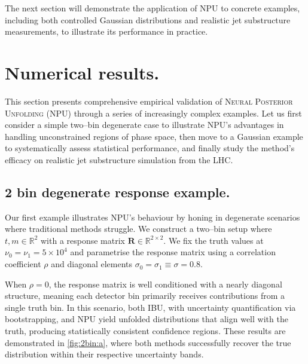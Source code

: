     The next section will demonstrate the application of NPU to concrete examples, including both controlled Gaussian distributions and realistic jet substructure measurements, to illustrate its performance in practice.
\section{Numerical results.}
    This section presents comprehensive empirical validation of \textsc{Neural Posterior Unfolding} (NPU) through a series of increasingly complex examples.
    Let us first consider a simple two--bin degenerate case to illustrate NPU's advantages in handling unconstrained regions of phase space, then move to a Gaussian example to systematically assess statistical performance, and finally study the method's efficacy on realistic jet substructure simulation from the LHC.
    \subsection{2 bin degenerate response example.}
        Our first example illustrates NPU's behaviour by honing in degenerate scenarios where traditional methods struggle.
        We construct a two--bin setup where $t, m \in \mathbb{R}^2$ with a response matrix $\mathbf{R} \in \mathbb{R}^{2 \times 2}$.
        We fix the truth values at $\nu_0 = \nu_1 = 5 \times 10^4$ and parametrise the response matrix using a correlation coefficient $\rho$ and diagonal elements $\sigma_0 = \sigma_1 \equiv \sigma = 0.8$.

When $\rho = 0$, the response matrix is well conditioned with a nearly diagonal structure, meaning each detector bin primarily receives contributions from a single truth bin.
%
In this scenario, both IBU, with uncertainty quantification via bootstrapping, and NPU yield unfolded distributions that align well with the truth, producing statistically consistent confidence regions.
%
These results are demonstrated in \cref{fig:2bin:a}, where both methods successfully recover the true distribution within their respective uncertainty bands.

